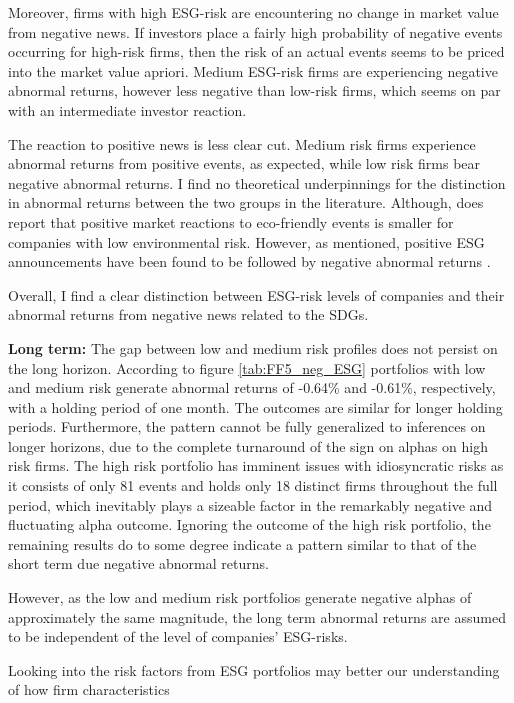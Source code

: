 Moreover, firms with high ESG-risk are encountering no change in market value from negative news. If investors place a fairly high probability of negative events occurring for high-risk firms, then the risk of an actual events seems to be priced into the market value apriori. Medium ESG-risk firms are experiencing negative abnormal returns, however less negative than low-risk firms, which seems on par with an intermediate investor reaction.  

The reaction to positive news is less clear cut. Medium risk firms experience abnormal returns from positive events, as expected, while low risk firms bear negative abnormal returns. I find no theoretical underpinnings for the distinction in abnormal returns between the two groups in the literature. Although, \cite{flammer2013corporate} does report that positive market reactions to eco-friendly events is smaller for companies with low environmental risk. However, as mentioned, positive ESG announcements have been found to be followed by negative abnormal returns \citep{fisher2011voluntary}.  

Overall, I find a clear distinction between ESG-risk levels of companies and their abnormal returns from negative news related to the SDGs. 

\textbf{Long term:}
The gap between low and medium risk profiles does not persist on the long horizon. According to figure \ref{tab:FF5_neg_ESG} portfolios with low and medium risk generate abnormal returns of -0.64\% and -0.61\%, respectively, with a holding period of one month. The outcomes are similar for longer holding periods. 
Furthermore, the pattern cannot be fully generalized to inferences on longer horizons, due to the complete turnaround of the sign on alphas on high risk firms. The high risk portfolio has imminent issues with idiosyncratic risks as it consists of only 81 events and holds only 18 distinct firms throughout the full period, which inevitably plays a sizeable factor in the remarkably negative and fluctuating alpha outcome. Ignoring the outcome of the high risk portfolio, the remaining results do to some degree indicate a pattern similar to that of the short term due negative abnormal returns.

However, as the low and medium risk portfolios generate negative alphas of approximately the same magnitude, the long term abnormal returns are assumed to be independent of the level of companies' ESG-risks. 


Looking into the risk factors from ESG portfolios may better our understanding of how firm characteristics 

